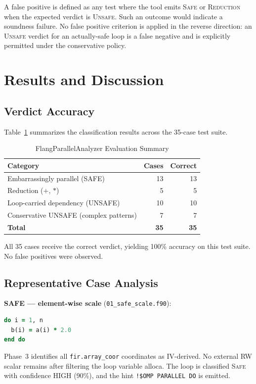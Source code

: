 \documentclass[conference]{IEEEtran}
\begin{document}
A false positive is defined as any test where the tool emits
\textsc{Safe} or \textsc{Reduction} when the expected verdict is
\textsc{Unsafe}.  Such an outcome would indicate a soundness failure.
No false positive criterion is applied in the reverse direction:
an \textsc{Unsafe} verdict for an actually-safe loop is a false
negative and is explicitly permitted under the conservative policy.

\section{Results and Discussion}
\label{sec:results}

\subsection{Verdict Accuracy}

Table~\ref{tab:results} summarizes the classification results across
the 35-case test suite.

\begin{table}[t]
\centering
\caption{FlangParallelAnalyzer Evaluation Summary}
\label{tab:results}
\begin{tabular}{lrr}
\toprule
\textbf{Category} & \textbf{Cases} & \textbf{Correct} \\
\midrule
Embarrassingly parallel (SAFE) & 13 & 13 \\
Reduction ($+$, $*$) & 5 & 5 \\
Loop-carried dependency (UNSAFE) & 10 & 10 \\
Conservative UNSAFE (complex patterns) & 7 & 7 \\
\midrule
\textbf{Total} & \textbf{35} & \textbf{35} \\
\bottomrule
\end{tabular}
\end{table}

All 35 cases receive the correct verdict, yielding 100\% accuracy
on this test suite.  No false positives were observed.

\subsection{Representative Case Analysis}

\textbf{SAFE — element-wise scale} (\texttt{01\_safe\_scale.f90}):
\begin{lstlisting}[language=Fortran,caption={Safe element-wise scale.}]
do i = 1, n
  b(i) = a(i) * 2.0
end do
\end{lstlisting}
Phase~3 identifies all \texttt{fir.array\_coor} coordinates as
IV-derived.  No external RW scalar remains after filtering the loop
variable alloca.  The loop is classified \textsc{Safe} with confidence
HIGH (90\%), and the hint \texttt{!\$OMP PARALLEL DO} is emitted.
\end{document}

